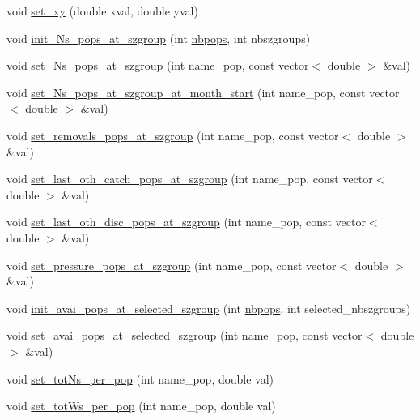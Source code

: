 \begin{DoxyCompactItemize}
\item 
void \mbox{\hyperlink{class_node_adf75ff7dc8ebec8b3c65a6a73ecfa739}{set\+\_\+xy}} (double xval, double yval)
\item 
void \mbox{\hyperlink{class_node_ac1dc5f03d4a0c46d4be75adfff33fe92}{init\+\_\+\+Ns\+\_\+pops\+\_\+at\+\_\+szgroup}} (int \mbox{\hyperlink{thread__vessels_8cpp_a664e1cfcbba8af93cd65eaeb74e3b3a5}{nbpops}}, int nbszgroups)
\item 
void \mbox{\hyperlink{class_node_a6a70f905da06efa6d8601e4b8fc5bd65}{set\+\_\+\+Ns\+\_\+pops\+\_\+at\+\_\+szgroup}} (int name\+\_\+pop, const vector$<$ double $>$ \&val)
\item 
void \mbox{\hyperlink{class_node_ae8bd68a9bf60f92e5b3dbbee91662286}{set\+\_\+\+Ns\+\_\+pops\+\_\+at\+\_\+szgroup\+\_\+at\+\_\+month\+\_\+start}} (int name\+\_\+pop, const vector$<$ double $>$ \&val)
\item 
void \mbox{\hyperlink{class_node_aa32dfbdbf44af7b5691913b7cace5e66}{set\+\_\+removals\+\_\+pops\+\_\+at\+\_\+szgroup}} (int name\+\_\+pop, const vector$<$ double $>$ \&val)
\item 
void \mbox{\hyperlink{class_node_a6f1a02caac22fdd4ecf8ab2c28795141}{set\+\_\+last\+\_\+oth\+\_\+catch\+\_\+pops\+\_\+at\+\_\+szgroup}} (int name\+\_\+pop, const vector$<$ double $>$ \&val)
\item 
void \mbox{\hyperlink{class_node_ab2426a0912b0ceb3570eeb85cf7e5377}{set\+\_\+last\+\_\+oth\+\_\+disc\+\_\+pops\+\_\+at\+\_\+szgroup}} (int name\+\_\+pop, const vector$<$ double $>$ \&val)
\item 
void \mbox{\hyperlink{class_node_a6a6f91aea3d5f26cd99cbdfe9f8936c5}{set\+\_\+pressure\+\_\+pops\+\_\+at\+\_\+szgroup}} (int name\+\_\+pop, const vector$<$ double $>$ \&val)
\item 
void \mbox{\hyperlink{class_node_afbe40cc9047938fbd4834c163866e2c0}{init\+\_\+avai\+\_\+pops\+\_\+at\+\_\+selected\+\_\+szgroup}} (int \mbox{\hyperlink{thread__vessels_8cpp_a664e1cfcbba8af93cd65eaeb74e3b3a5}{nbpops}}, int selected\+\_\+nbszgroups)
\item 
void \mbox{\hyperlink{class_node_a1bfd5539b72ad196382ec0a18d0b97ba}{set\+\_\+avai\+\_\+pops\+\_\+at\+\_\+selected\+\_\+szgroup}} (int name\+\_\+pop, const vector$<$ double $>$ \&val)
\item 
void \mbox{\hyperlink{class_node_a3726d08a6231ebc60bedc80894864dcd}{set\+\_\+tot\+Ns\+\_\+per\+\_\+pop}} (int name\+\_\+pop, double val)
\item 
void \mbox{\hyperlink{class_node_ae0bb6fae592ffe6d37176185811d22f4}{set\+\_\+tot\+Ws\+\_\+per\+\_\+pop}} (int name\+\_\+pop, double val)

\end{DoxyCompactItemize}
